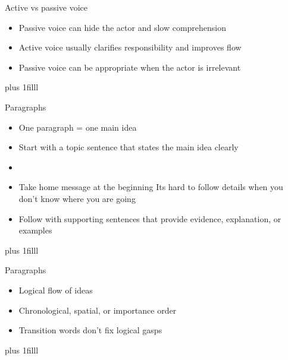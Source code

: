 \documentclass[aspectratio=169]{beamer}
\newcommand{\btVFill}{\vskip0pt plus 1filll}
\begin{document}

\begin{frame}{Active vs passive voice}
  \begin{itemize}
    \item Passive voice can hide the actor and slow comprehension
    \item Active voice usually clarifies responsibility and improves flow
    \item Passive voice can be appropriate when the actor is irrelevant
  \end{itemize}
\btVFill
\end{frame}

\begin{frame}{Paragraphs}
\begin{itemize}
\item One paragraph = one main idea
\item Start with a topic sentence that states the main idea clearly
\item \item Take home message at the beginning
Its hard to follow details when you don't know where you are going
\item Follow with supporting sentences that provide evidence, explanation, or examples
\end{itemize}
\btVFill\end{frame}

\begin{frame}{Paragraphs}
\begin{itemize}
\item Logical flow of ideas
\item Chronological, spatial, or importance order
\item Transition words don't fix logical gasps
\end{itemize}
\btVFill\end{frame}
\end{document}
